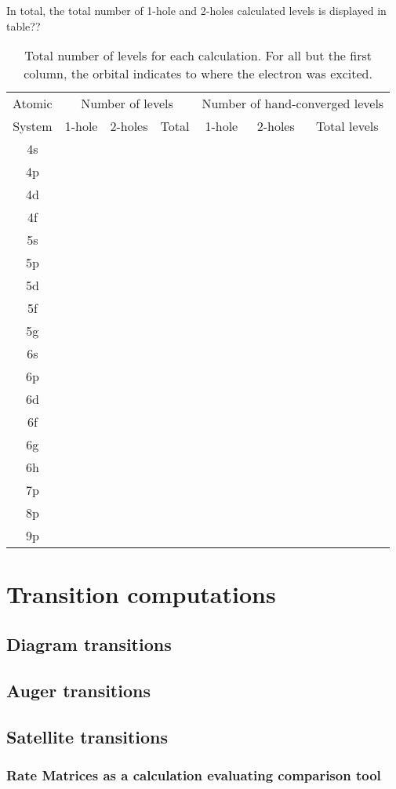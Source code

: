 In total, the total number of 1-hole and 2-holes calculated levels is displayed in table??

\begin{table}[h!]
    \centering
    \caption{Total number of levels for each calculation. For all but the first column, the orbital indicates to where the electron was excited.}
    \label{tab:tot_ang_mom}
    \begin{tabular}{c||c|c|c||c|c|c}
        \toprule Atomic&\multicolumn{3}{c||}{Number of levels}&\multicolumn{3}{c}{Number of hand-converged levels}\\
        System&1-hole&2-holes&Total&1-hole&2-holes&Total levels\\
        \midrule 4s\\
        4p\\
        4d\\
        4f\\
        5s\\
        5p\\
        5d\\
        5f\\
        5g\\
        6s\\
        6p\\
        6d\\
        6f\\
        6g\\
        6h\\
        7p\\
        8p\\
        9p\\
        \bottomrule
    \end{tabular}
\end{table}



\section{Transition computations}

\subsection{Diagram transitions}
\subsection{Auger transitions}
\subsection{Satellite transitions}

\subsubsection{Rate Matrices as a calculation evaluating comparison tool}

